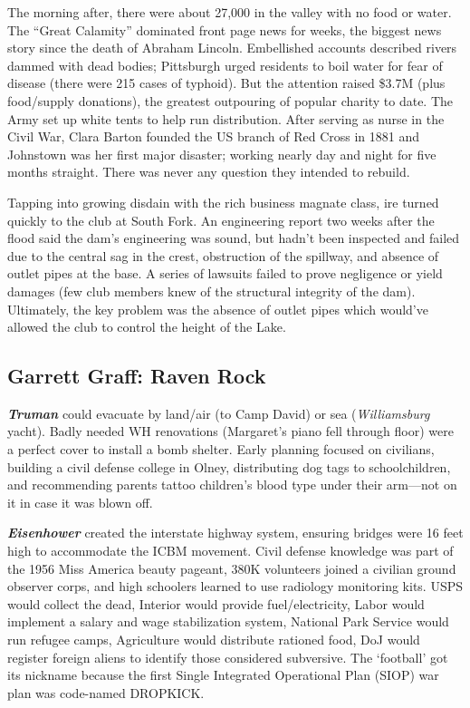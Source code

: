 \documentclass[
]{article}
\begin{document}
The morning after, there were about 27,000 in the valley with no food or
water. The ``Great Calamity'' dominated front page news for weeks, the
biggest news story since the death of Abraham Lincoln. Embellished
accounts described rivers dammed with dead bodies; Pittsburgh urged
residents to boil water for fear of disease (there were 215 cases of
typhoid). But the attention raised \$3.7M (plus food/supply donations),
the greatest outpouring of popular charity to date. The Army set up
white tents to help run distribution. After serving as nurse in the
Civil War, Clara Barton founded the US branch of Red Cross in 1881 and
Johnstown was her first major disaster; working nearly day and night for
five months straight. There was never any question they intended to
rebuild.

Tapping into growing disdain with the rich business magnate class, ire
turned quickly to the club at South Fork. An engineering report two
weeks after the flood said the dam's engineering was sound, but hadn't
been inspected and failed due to the central sag in the crest,
obstruction of the spillway, and absence of outlet pipes at the base. A
series of lawsuits failed to prove negligence or yield damages (few club
members knew of the structural integrity of the dam). Ultimately, the
key problem was the absence of outlet pipes which would've allowed the
club to control the height of the Lake.

\hypertarget{garrett-graff-raven-rock}{%
\subsection{Garrett Graff: Raven Rock}\label{garrett-graff-raven-rock}}

\textbf{\emph{Truman}} could evacuate by land/air (to Camp David) or sea
(\emph{Williamsburg} yacht). Badly needed WH renovations (Margaret's
piano fell through floor) were a perfect cover to install a bomb
shelter. Early planning focused on civilians, building a civil defense
college in Olney, distributing dog tags to schoolchildren, and
recommending parents tattoo children's blood type under their arm---not
on it in case it was blown off.

\textbf{\emph{Eisenhower}} created the interstate highway system,
ensuring bridges were 16 feet high to accommodate the ICBM movement.
Civil defense knowledge was part of the 1956 Miss America beauty
pageant, 380K volunteers joined a civilian ground observer corps, and
high schoolers learned to use radiology monitoring kits. USPS would
collect the dead, Interior would provide fuel/electricity, Labor would
implement a salary and wage stabilization system, National Park Service
would run refugee camps, Agriculture would distribute rationed food, DoJ
would register foreign aliens to identify those considered subversive.
The `football' got its nickname because the first Single Integrated
Operational Plan (SIOP) war plan was code-named DROPKICK.
\end{document}
